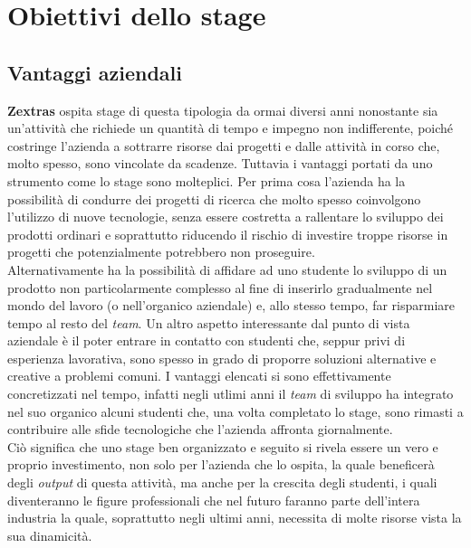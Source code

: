 
\chapter{Obiettivi dello stage}
\label{cap:obiettivi}


\section{Vantaggi aziendali}
    \textbf{Zextras} ospita stage di questa tipologia da ormai diversi anni nonostante sia un'attività che richiede un quantità di tempo e impegno non indifferente, poiché costringe l'azienda a sottrarre risorse dai progetti e dalle attività in corso che, molto spesso, sono vincolate da scadenze. Tuttavia i vantaggi portati da uno strumento come lo stage sono molteplici. Per prima cosa l'azienda ha la possibilità di condurre dei progetti di ricerca che molto spesso coinvolgono l'utilizzo di nuove tecnologie, senza essere costretta a rallentare lo sviluppo dei prodotti ordinari e soprattutto riducendo il rischio di investire troppe risorse in progetti che potenzialmente potrebbero non proseguire. \\
    Alternativamente ha la possibilità di affidare ad uno studente lo sviluppo di un prodotto non particolarmente complesso al fine di inserirlo gradualmente nel mondo del lavoro (o nell'organico aziendale) e, allo stesso tempo, far risparmiare tempo al resto del \textit{team}.
    Un altro aspetto interessante dal punto di vista aziendale è il poter entrare in contatto con studenti che, seppur privi di esperienza lavorativa, sono spesso in grado di proporre soluzioni alternative e creative a problemi comuni. I vantaggi elencati si sono effettivamente concretizzati nel tempo, infatti negli utlimi anni il \textit{team} di sviluppo ha integrato nel suo organico alcuni studenti che, una volta completato lo stage, sono rimasti a contribuire alle sfide tecnologiche che l'azienda affronta giornalmente. \\
    Ciò significa che uno stage ben organizzato e seguito si rivela essere un vero e proprio investimento, non solo per l'azienda che lo ospita, la quale beneficerà degli \textit{output} di questa attività, ma anche per la crescita degli studenti, i quali diventeranno le figure professionali che nel futuro faranno parte dell'intera industria la quale, soprattutto negli ultimi anni, necessita di molte risorse vista la sua dinamicità.

